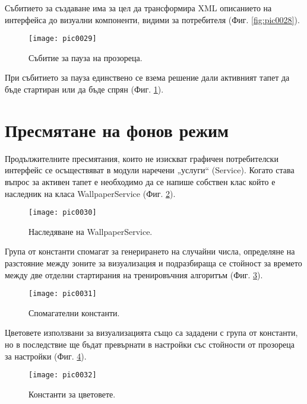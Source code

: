 Събитието за създаване има за цел да трансформира XML описанието на интерфейса до визуални компоненти, видими за потребителя (Фиг. \ref{fig:pic0028}). 

\begin{figure}[h]
  \centering
  \texttt{[image: pic0029]}
  \caption{Събитие за пауза на прозореца.}
\label{fig:pic0029}
\end{figure}
\FloatBarrier

При събитието за пауза единствено се взема решение дали активният тапет да бъде стартиран или да бъде спрян (Фиг. \ref{fig:pic0029}). 

\section{Пресмятане на фонов режим}

Продължителните пресмятания, които не изискват графичен потребителски интерфейс се осъществяват в модули наречени „услуги“ (Service). Когато става въпрос за активен тапет е необходимо да се напише собствен клас който е наследник на класа WallpaperService (Фиг. \ref{fig:pic0030}).

\begin{figure}[h]
  \centering
  \texttt{[image: pic0030]}
  \caption{Наследяване на WallpaperService.}
\label{fig:pic0030}
\end{figure}
\FloatBarrier

Група от константи спомагат за генерирането на случайни числа, определяне на разстояние между зоните за визуализация и подразбираща се стойност за времето между две отделни стартирания на тренировъчния алгоритъм (Фиг. \ref{fig:pic0031}). 

\begin{figure}[h]
  \centering
  \texttt{[image: pic0031]}
  \caption{Спомагателни константи.}
\label{fig:pic0031}
\end{figure}
\FloatBarrier

Цветовете използвани за визуализацията също са зададени с група от константи, но в последствие ще бъдат превърнати в настройки със стойности от прозореца за настройки (Фиг. \ref{fig:pic0032}).

\begin{figure}[h]
  \centering
  \texttt{[image: pic0032]}
  \caption{Константи за цветовете.}
\label{fig:pic0032}
\end{figure}
\FloatBarrier

